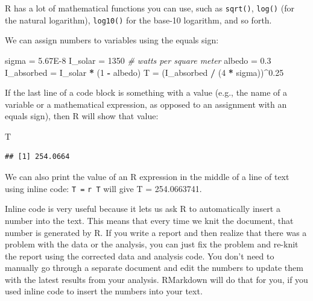 \documentclass[
]{article}
\newenvironment{Shaded}{\begin{snugshade}}{\end{snugshade}}
\newcommand{\CommentTok}[1]{\textcolor[rgb]{0.56,0.35,0.01}{\textit{#1}}}
\newcommand{\DecValTok}[1]{\textcolor[rgb]{0.00,0.00,0.81}{#1}}
\newcommand{\FloatTok}[1]{\textcolor[rgb]{0.00,0.00,0.81}{#1}}
\newcommand{\NormalTok}[1]{#1}
\newcommand{\OperatorTok}[1]{\textcolor[rgb]{0.81,0.36,0.00}{\textbf{#1}}}
\newcommand{\StringTok}[1]{\textcolor[rgb]{0.31,0.60,0.02}{#1}}
\begin{document}
R has a lot of mathematical functions you can use, such as
\texttt{sqrt()}, \texttt{log()} (for the natural logarithm),
\texttt{log10()} for the base-10 logarithm, and so forth.

We can assign numbers to variables using the equals sign:

\begin{Shaded}
\begin{Highlighting}[]
\NormalTok{sigma =}\StringTok{ }\FloatTok{5.67E-8}
\NormalTok{I_solar =}\StringTok{ }\DecValTok{1350} \CommentTok{# watts per square meter}
\NormalTok{albedo =}\StringTok{ }\FloatTok{0.3}
\NormalTok{I_absorbed =}\StringTok{ }\NormalTok{I_solar }\OperatorTok{*}\StringTok{ }\NormalTok{(}\DecValTok{1} \OperatorTok{-}\StringTok{ }\NormalTok{albedo)}
\NormalTok{T =}\StringTok{ }\NormalTok{(I_absorbed }\OperatorTok{/}\StringTok{ }\NormalTok{(}\DecValTok{4} \OperatorTok{*}\StringTok{ }\NormalTok{sigma))}\OperatorTok{^}\FloatTok{0.25}
\end{Highlighting}
\end{Shaded}

If the last line of a code block is something with a value (e.g., the
name of a variable or a mathematical expression, as opposed to an
assignment with an equals sign), then R will show that value:

\begin{Shaded}
\begin{Highlighting}[]
\NormalTok{T}
\end{Highlighting}
\end{Shaded}

\begin{verbatim}
## [1] 254.0664
\end{verbatim}

We can also print the value of an R expression in the middle of a line
of text using inline code: \texttt{T\ =}
\texttt{\textasciigrave{}r\ T\textasciigrave{}} will give T =
254.0663741.

Inline code is very useful because it lets us ask R to automatically
insert a number into the text. This means that every time we knit the
document, that number is generated by R. If you write a report and then
realize that there was a problem with the data or the analysis, you can
just fix the problem and re-knit the report using the corrected data and
analysis code. You don't need to manually go through a separate document
and edit the numbers to update them with the latest results from your
analysis. RMarkdown will do that for you, if you used inline code to
insert the numbers into your text.
\end{document}
